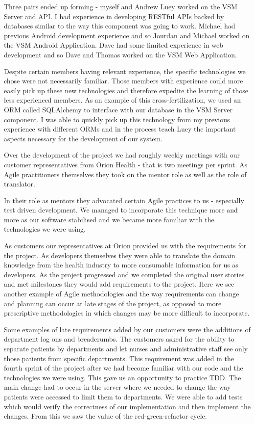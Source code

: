 \documentclass[conference]{IEEEtran}
\begin{document}
Three pairs ended up forming - myself and Andrew Luey worked on the VSM Server
and API. I had experience in developing RESTful APIs backed by databases similar
to the way this component was going to work. Michael had previous Android
development experience and so Jourdan and Michael worked on the VSM Android
Application. Dave had some limited experience in web development and so Dave and
Thomas worked on the VSM Web Application.

Despite certain members having relevant experience, the specific technologies we
chose were not necessarily familiar. Those members with experience could more
easily pick up these new technologies and therefore expedite the learning of
those less experienced members. As an example of this cross-fertilization, we
used an ORM called SQLAlchemy to interface with our database in the VSM Server
component. I was able to quickly pick up this technology from my previous
experience with different ORMs and in the process teach Luey the important
aspects necessary for the development of our system.

Over the development of the project we had roughly weekly meetings with our
customer representatives from Orion Health - that is two meetings per sprint. As
Agile practitioners themselves they took on the mentor role as well as the role
of translator.

In their role as mentors they advocated certain Agile practices to us -
especially test driven development. We managed to incorporate this technique
more and more as our software stabilised and we became more familiar with the
technologies we were using.

As customers our representatives at Orion provided us with the requirements for
the project. As developers themselves they were able to translate the domain
knowledge from the health industry to more consumable information for us as
developers. As the project progressed and we completed the original user stories
and met milestones they would add requirements to the project. Here we see
another example of Agile methodologies and the way requirements can change and
planning can occur at late stages of the project, as opposed to more
prescriptive methodologies in which changes may be more difficult to
incorporate.

Some examples of late requirements added by our customers were the additions of
department log ons and breadcrumbs. The customers asked for the ability to
separate patients by departments and let nurses and administrative staff see
only those patients from specific departments. This requirement was added in the
fourth sprint of the project after we had become familiar with our code and the
technologies we were using. This gave us an opportunity to practice TDD. The
main change had to occur in the server where we needed to change the way
patients were accessed to limit them to departments. We were able to add tests
which would verify the correctness of our implementation and then implement the
changes. From this we saw the value of the red-green-refactor cycle.
\end{document}
